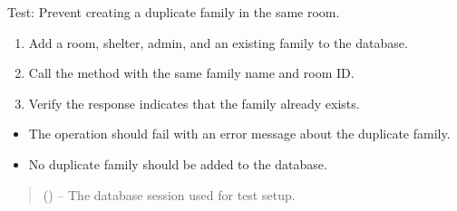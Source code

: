 \documentclass[letterpaper,10pt,english]{sphinxmanual}
\begin{document}
\begin{fulllineitems}
\label{\detokenize{test:test.test_family.test_create_family_duplicate}}
\pysigstartsignatures
\pysiglinewithargsret
{}
{}
{}
\pysigstopsignatures
\sphinxAtStartPar
Test: Prevent creating a duplicate family in the same room.
\begin{description}
\begin{enumerate}
%
\item {} 
\sphinxAtStartPar
Add a room, shelter, admin, and an existing family to the database.

\item {} 
\sphinxAtStartPar
Call the  method with the same family name and room ID.

\item {} 
\sphinxAtStartPar
Verify the response indicates that the family already exists.

\end{enumerate}

\begin{itemize}
\item {} 
\sphinxAtStartPar
The operation should fail with an error message about the duplicate family.

\item {} 
\sphinxAtStartPar
No duplicate family should be added to the database.

\end{itemize}

\end{description}
\begin{quote}\begin{description}
\sphinxAtStartPar
{} () – The database session used for test setup.

\end{description}\end{quote}

\end{fulllineitems}

\end{document}
